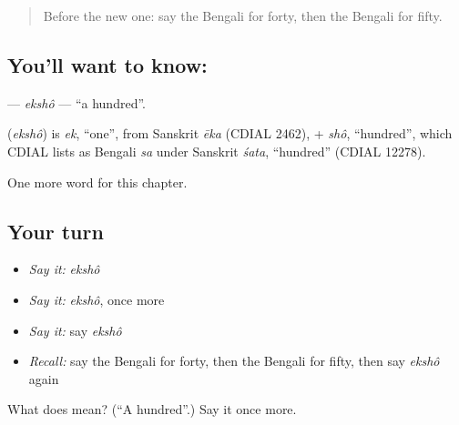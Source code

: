 \label{lesson:BN-C87-eksho}



\begin{quote}
Before the new one: say the Bengali for forty, then the Bengali for fifty.
\end{quote}

\subsection*{You'll want to know: }
\textbf{} — \emph{ekshô} — \textquotedblleft{}a hundred\textquotedblright{}.

\begin{cousinweb}
\textbf{} (\emph{ekshô}) is \emph{ek}, \textquotedblleft{}one\textquotedblright{}, from Sanskrit \emph{ēka} (CDIAL 2462), + \emph{shô}, \textquotedblleft{}hundred\textquotedblright{}, which CDIAL lists as Bengali \emph{sa} under Sanskrit \emph{śata}, \textquotedblleft{}hundred\textquotedblright{} (CDIAL 12278).
\end{cousinweb}

\begin{grammarlens}[title={What you've built}]
One more word for this chapter.
\end{grammarlens}

\subsection*{Your turn}
\begin{itemize}
\raggedright
  \item \emph{Say it:} \emph{ekshô}
  \item \emph{Say it:} \emph{ekshô}, once more
  \item \emph{Say it:} say \emph{ekshô}
  \item \emph{Recall:} say the Bengali for forty, then the Bengali for fifty, then say \emph{ekshô} again
\end{itemize}

\begin{tcolorbox}[breakable,colback=teal!4,colframe=teal!35!black,title={Before you move on}]
What does  mean? (\textquotedblleft{}A hundred\textquotedblright{}.) Say it once more.
\end{tcolorbox}
